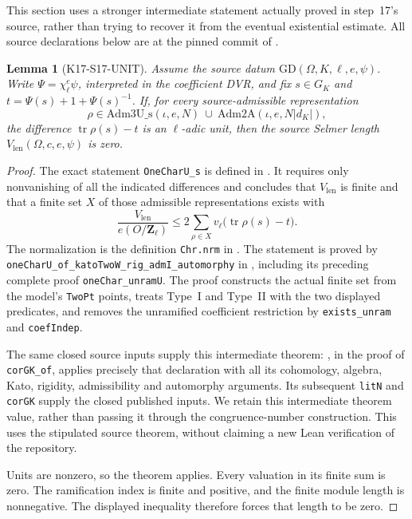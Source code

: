 \documentclass[11pt,a4paper]{article}
\newtheorem{lemma}[theorem]{Lemma}
\theoremstyle{definition}
\begin{document}
This section uses a stronger intermediate statement actually proved in
step~17's source, rather than trying to recover it from the eventual
existential estimate. All source declarations below are at the pinned
commit of \cite{K17PinnedLeanMirror}.

\begin{lemma}[K17-S17-UNIT]\label{lem:step17-unit}
Assume the source datum $\mathrm{GD}(\Omega,K,\ell,e,\psi)$.
Write $\Psi=\chi_\ell^e\psi$, interpreted in the coefficient DVR, and
fix $s\in G_K$ and $t=\Psi(s)+1+\Psi(s)^{-1}$.
If, for every source-admissible representation
\[
 \rho\in\mathrm{Adm3U\_s}(\iota,e,N)
       \ \cup\ \mathrm{Adm2A}(\iota,e,N|d_K|),
\]
the difference $\operatorname{tr}\rho(s)-t$ is an $\ell$-adic unit,
then the source Selmer length $V_{\mathrm{len}}(\Omega,c,e,\psi)$ is zero.
\end{lemma}

\begin{proof}
The exact statement \texttt{OneCharU\_s} is defined in
.
It requires only nonvanishing of all the indicated differences and concludes
that $V_{\mathrm{len}}$ is finite and that a finite set $X$ of those
admissible representations exists with
\[
 \frac{V_{\mathrm{len}}}{e(O/\mathbf Z_\ell)}
 \le 2\sum_{\rho\in X}
       v_\ell\bigl(\operatorname{tr}\rho(s)-t\bigr).
\]
The normalization is the definition \texttt{Chr.nrm} in
.
The statement is proved by
\texttt{oneCharU\_of\_katoTwoW\_rig\_admI\_automorphy} in
, including its preceding
complete proof \texttt{oneChar\_unramU}. The proof constructs the actual
finite set from the model's \texttt{TwoPt} points, treats Type~I and
Type~II with the two displayed predicates, and removes the unramified
coefficient restriction by \texttt{exists\_unram} and
\texttt{coefIndep}.

The same closed source inputs supply this intermediate theorem:
, in the proof of
\texttt{corGK\_of}, applies precisely that declaration with all its
cohomology, algebra, Kato, rigidity, admissibility and automorphy arguments.
Its subsequent \texttt{litN} and \texttt{corGK} supply the closed published
inputs. We retain this intermediate theorem value, rather than passing it
through the congruence-number construction. This uses the stipulated source
theorem, without claiming a new Lean verification of the repository.

Units are nonzero, so the theorem applies. Every valuation in its finite
sum is zero. The ramification index is finite and positive, and the finite
module length is nonnegative. The displayed inequality therefore forces
that length to be zero.
\end{proof}
\end{document}
